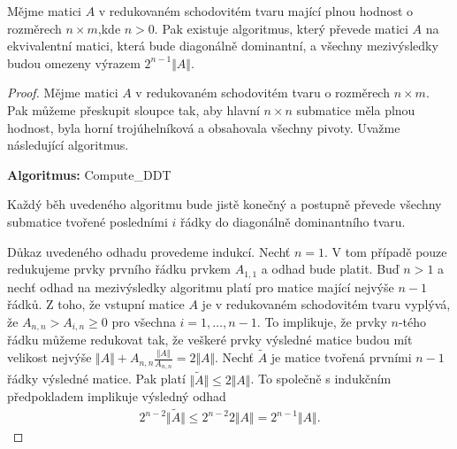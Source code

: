 \begin{lem} \label{DDT_Algo}
Mějme matici $ A $ v redukovaném schodovitém tvaru mající plnou hodnost o 
rozměrech $ n \times m $,kde $ n > 0 $.
Pak existuje algoritmus, který převede matici $ A $ na ekvivalentní matici, 
která bude diagonálně dominantní, a všechny mezivýsledky budou omezeny výrazem
$ 2^{n - 1} \Vert A \Vert $.
\end{lem}
\begin{proof}
Mějme matici $ A $ v redukovaném schodovitém tvaru o rozměrech $ n \times m $. 
Pak můžeme přeskupit sloupce tak, aby hlavní $ n \times n $ submatice měla plnou
hodnost, byla horní trojúhelníková a obsahovala všechny pivoty. Uvažme 
následující algoritmus.\\
%
    \begin{algorithm} 
    {
        \textbf{Algoritmus:} Compute\_DDT
    }



    \end{algorithm} 

Každý běh uvedeného algoritmu bude jistě konečný a postupně převede všechny 
submatice tvořené posledními $ i $ řádky do diagonálně dominantního tvaru.

Důkaz uvedeného odhadu provedeme indukcí. Nechť $ n = 1 $. V tom případě pouze
redukujeme prvky prvního řádku prvkem $ A_{1,1} $ a odhad bude platit.
Buď $ n > 1 $ a nechť odhad na mezivýsledky algoritmu platí pro matice mající
nejvýše $ n - 1 $ řádků. Z toho, že vstupní matice $ A $ je v redukovaném 
schodovitém tvaru vyplývá, že $ A_{n,n} > A_{i, n} \geq 0 $ pro všechna 
$ i = 1, \dots, n - 1 $. To implikuje, že prvky $ n $-tého řádku můžeme redukovat
tak, že veškeré prvky výsledné matice budou mít velikost nejvýše 
$ \Vert A \Vert + A_{n,n} \frac{\Vert A \Vert} {A_{n,n}} = 2 \Vert A \Vert $.
Nechť $ \tilde{A} $ je matice tvořená prvními $ n - 1 $ řádky výsledné matice.
Pak platí $ \Vert \tilde{A} \Vert \leq 2 \Vert A \Vert $. To společně s
indukčním předpokladem implikuje výsledný odhad 
\begin{align*}
    2^{n - 2} \Vert \tilde{A} \Vert 
        \leq 2^{n - 2} 2 \Vert A \Vert 
        = 2^{n - 1} \Vert A \Vert.
\end{align*}
\qedhere
\end{proof}




